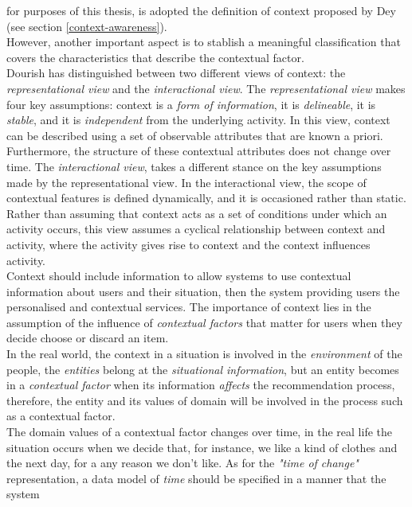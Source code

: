 for purposes of this thesis, is adopted the definition of context
proposed by Dey\cite{dey2001understanding} (see section 
\ref{context-awareness}). \\However, another important aspect 
is to stablish a meaningful classification that covers the 
characteristics that describe the contextual factor.\\
Dourish\cite{dourish2004we} has distinguished between two different
views of context: the \textit{representational view} and the
\textit{interactional view}. The \textit{representational view} makes
four key assumptions: context is a \textit{form of information}, it is
\textit{delineable}, it is \textit{stable}, and it is
\textit{independent} from the underlying activity. In this view,
context can be described using a set of observable attributes that are
known a priori. Furthermore, the structure of these contextual
attributes does not change over time. The \textit{interactional view},
takes a different stance on the key assumptions made by the
representational view. In the interactional view, the scope of
contextual features is defined dynamically, and it is occasioned
rather than static. Rather than assuming that context acts as a set of
conditions under which an activity occurs, this view assumes a
cyclical relationship between context and activity, where the activity
gives rise to context and the context influences activity.\\
Context should include information to allow systems to use contextual
information about users and their situation, then the system providing
users the personalised and contextual services. The importance of
context lies in the  assumption of the influence of \textit{contextual
factors} that matter for users when they decide choose or discard an
item.\\
In the real world, the context in a situation is involved in the
\textit{environment} of the people, the \textit{entities} belong at
the \textit{situational information}, but an entity  becomes in a
\textit{contextual factor} when its information \textit{affects} the
recommendation process, therefore, the entity and its values of 
domain will be involved in the process such as a contextual factor.\\
The domain values of a contextual factor changes over time, in
the real life the situation occurs when we decide that, for instance,
we like a kind of clothes and the next day, for a any reason we don't
like. As for the \textit{"time of change"} representation, a data 
model of \textit{time} should be specified in a manner that the system
